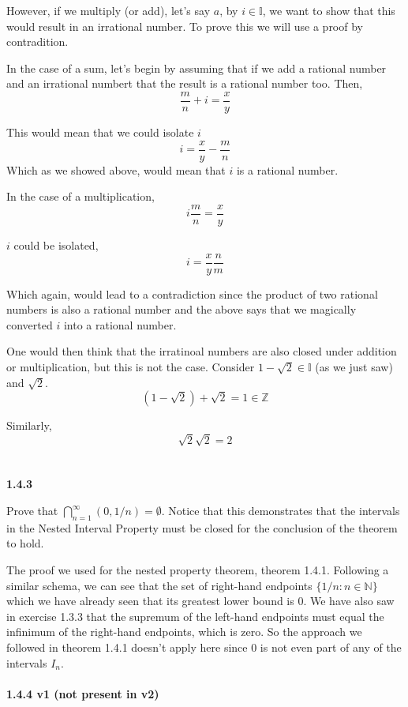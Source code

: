 However, if we multiply (or add), let's say $a$, by $i \in \mathbb{I}$, we want to show that this would result in an irrational number.
To prove this we will use a proof by contradition.

In the case of a sum, let's begin by assuming that if we add a rational number and an irrational numbert
that the result is a rational number too.
Then,
$$
\frac{m}{n} + i = \frac{x}{y}
$$

This would mean that we could isolate $i$
$$
i = \frac{x}{y} - \frac{m}{n}
$$
Which as we showed above, would mean that $i$ is a rational number.

In the case of a multiplication,
$$
i \frac{m}{n} = \frac{x}{y}
$$

$i$ could be isolated,
$$
i = \frac{x}{y} \frac{n}{m}
$$

Which again, would lead to a contradiction since the product of two rational numbers is also a rational number
and the above says that we magically converted $i$ into a rational number.

One would then think that the irratinoal numbers are also closed under addition or multiplication, but this is not the case.
Consider $1 - \sqrt{2} \in \mathbb{I}$ (as we just saw) and $\sqrt{2}$.
$$
( 1 - \sqrt{2} ) + \sqrt{2} = 1 \in \mathbb{Z}
$$

Similarly,
$$
\sqrt{2}\sqrt{2} = 2
$$
\\~\\

\label{abbott:1.4.3}
\textbf{1.4.3}

Prove that $\bigcap^{\infty}_{n=1} (0, 1/n) = \emptyset$. 
Notice that this demonstrates that the intervals in the Nested Interval Property
must be closed for the conclusion of the theorem to hold.

The proof we used for the nested property theorem, theorem 1.4.1.
Following a similar schema, we can see that the set of right-hand endpoints $\{ 1/n : n\in\mathbb{N} \}$ which we have
already seen that its greatest lower bound is 0.
We have also saw in exercise 1.3.3 that the supremum of the left-hand endpoints must equal the infinimum of the right-hand
endpoints, which is zero.
So the approach we followed in theorem 1.4.1 doesn't apply here since 0 is not even part of any of the intervals $I_n$.
\\~\\


\textbf{1.4.4 v1 (not present in v2)}

